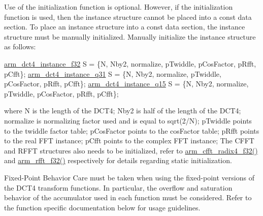 \begin{DoxyParagraph}{}
Use of the initialization function is optional. However, if the initialization function is used, then the instance structure cannot be placed into a const data section. To place an instance structure into a const data section, the instance structure must be manually initialized. Manually initialize the instance structure as follows\-: 
\begin{DoxyPre}   
\hyperlink{structarm__dct4__instance__f32}{arm\_dct4\_instance\_f32} S = \{N, Nby2, normalize, pTwiddle, pCosFactor, pRfft, pCfft\};   
\hyperlink{structarm__dct4__instance__q31}{arm\_dct4\_instance\_q31} S = \{N, Nby2, normalize, pTwiddle, pCosFactor, pRfft, pCfft\};  
\hyperlink{structarm__dct4__instance__q15}{arm\_dct4\_instance\_q15} S = \{N, Nby2, normalize, pTwiddle, pCosFactor, pRfft, pCfft\};  
 \end{DoxyPre}
 where {\ttfamily N} is the length of the D\-C\-T4; {\ttfamily Nby2} is half of the length of the D\-C\-T4; {\ttfamily normalize} is normalizing factor used and is equal to {\ttfamily sqrt(2/\-N)}; {\ttfamily p\-Twiddle} points to the twiddle factor table; {\ttfamily p\-Cos\-Factor} points to the cos\-Factor table; {\ttfamily p\-Rfft} points to the real F\-F\-T instance; {\ttfamily p\-Cfft} points to the complex F\-F\-T instance; The C\-F\-F\-T and R\-F\-F\-T structures also needs to be initialized, refer to \hyperlink{group___c_f_f_t___c_i_f_f_t_ga521f670cd9c571bc61aff9bec89f4c26}{arm\-\_\-cfft\-\_\-radix4\-\_\-f32()} and \hyperlink{group___r_f_f_t___r_i_f_f_t_ga3df1766d230532bc068fc4ed69d0fcdc}{arm\-\_\-rfft\-\_\-f32()} respectively for details regarding static initialization.
\end{DoxyParagraph}
\begin{DoxyParagraph}{Fixed-\/\-Point Behavior }
Care must be taken when using the fixed-\/point versions of the D\-C\-T4 transform functions. In particular, the overflow and saturation behavior of the accumulator used in each function must be considered. Refer to the function specific documentation below for usage guidelines. 
\end{DoxyParagraph}



